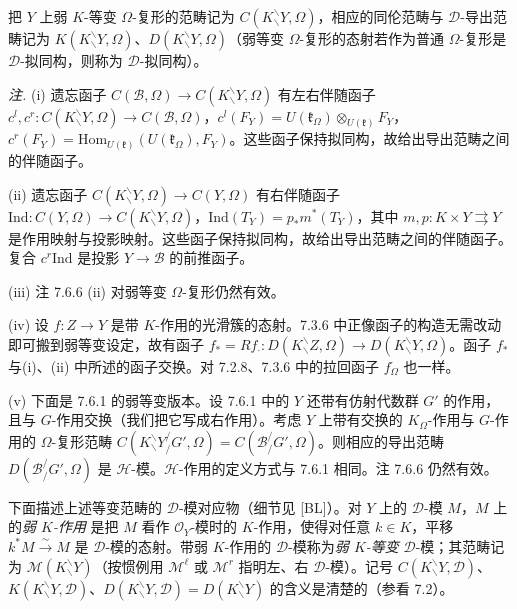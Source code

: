 
 把 $Y$ 上弱 $K$-等变 $\Omega$-复形的范畴记为 $C(K^{\backslash}_{\backslash}Y,\Omega)$，相应的同伦范畴与 $\mathcal{D}$-导出范畴记为 $K(K^{\backslash}_{\backslash}Y,\Omega)$、$D(K^{\backslash}_{\backslash}Y,\Omega)$（弱等变 $\Omega$-复形的态射若作为普通 $\Omega$-复形是 $\mathcal{D}$-拟同构，则称为 $\mathcal{D}$-拟同构）。

 \emph{注.} (i) 遗忘函子 $C(\mathcal{B},\Omega)\to C(K^{\backslash}_{\backslash}Y,\Omega)$ 有左右伴随函子 $c^{l},c^{r}:C(K^{\backslash}_{\backslash}Y,\Omega)\to C(\mathcal{B},\Omega)$，$c^{l}(F_{Y})=U(\mathfrak{k}_{\Omega})\otimes_{U(\mathfrak{k})}F_{Y}$，$c^{r}(F_{Y})=\mathrm{Hom}_{U(\mathfrak{k})}(U(\mathfrak{k}_{\Omega}),F_{Y})$。这些函子保持拟同构，故给出导出范畴之间的伴随函子。

(ii) 遗忘函子 $C(K^{\backslash}_{\backslash}Y,\Omega)\to C(Y,\Omega)$ 有右伴随函子 $\mathrm{Ind}:C(Y,\Omega)\to C(K^{\backslash}_{\backslash}Y,\Omega)$，$\mathrm{Ind}(T^{\cdot}_{Y})=p_{*}m^{*}(T^{\cdot}_{Y})$，其中 $m,p:K\times Y\rightrightarrows Y$ 是作用映射与投影映射。这些函子保持拟同构，故给出导出范畴之间的伴随函子。复合 $c^{r}\mathrm{Ind}$ 是投影 $Y\to\mathcal{B}$ 的前推函子。

(iii) 注 7.6.6 (ii) 对弱等变 $\Omega$-复形仍然有效。


(iv) 设 $f:Z\to Y$ 是带 $K$-作用的光滑簇的态射。7.3.6 中正像函子的构造无需改动即可搬到弱等变设定，故有函子 $f_{*}=Rf_{\cdot}:D(K^{\backslash}_{\backslash}Z,\Omega)\to D(K^{\backslash}_{\backslash}Y,\Omega)$。函子 $f_{*}$ 与(i)、(ii) 中所述的函子交换。对 7.2.8、7.3.6 中的拉回函子 $f^{\cdot}_{\Omega}$ 也一样。

(v) 下面是 7.6.1 的弱等变版本。设 7.6.1 中的 $Y$ 还带有仿射代数群 $G'$ 的作用，且与 $G$-作用交换（我们把它写成右作用）。考虑 $Y$ 上带有交换的 $K_{\Omega}$-作用与 $G$-作用的 $\Omega$-复形范畴 $C(K^{\backslash}_{\backslash}Y_{/}^{/}G',\Omega)=C(\mathcal{B}_{/}^{/}G',\Omega)$。则相应的导出范畴 $D(\mathcal{B}_{/}^{/}G',\Omega)$ 是 $\mathcal{H}$-模。$\mathcal{H}$-作用的定义方式与 7.6.1 相同。注 7.6.6 仍然有效。


 下面描述上述等变范畴的 $\mathcal{D}$-模对应物（细节见 [BL]）。对 $Y$ 上的 $\mathcal{D}$-模 $M$，$M$ 上的\emph{弱 $K$-作用} 是把 $M$ 看作 $\mathcal{O}_{Y}$-模时的 $K$-作用，使得对任意 $k\in K$，平移 $k^{*}M\xrightarrow{\sim}M$ 是 $\mathcal{D}$-模的态射。带弱 $K$-作用的 $\mathcal{D}$-模称为\emph{弱 $K$-等变} $\mathcal{D}$-模；其范畴记为 $\mathcal{M}(K^{\backslash}_{\backslash}Y)$（按惯例用 $\mathcal{M}^{\ell}$ 或 $\mathcal{M}^{r}$ 指明左、右 $\mathcal{D}$-模）。记号 $C(K^{\backslash}_{\backslash}Y,\mathcal{D})$、$K(K^{\backslash}_{\backslash}Y,\mathcal{D})$、$D(K^{\backslash}_{\backslash}Y,\mathcal{D})=D(K^{\backslash}_{\backslash}Y)$ 的含义是清楚的（参看 7.2）。

